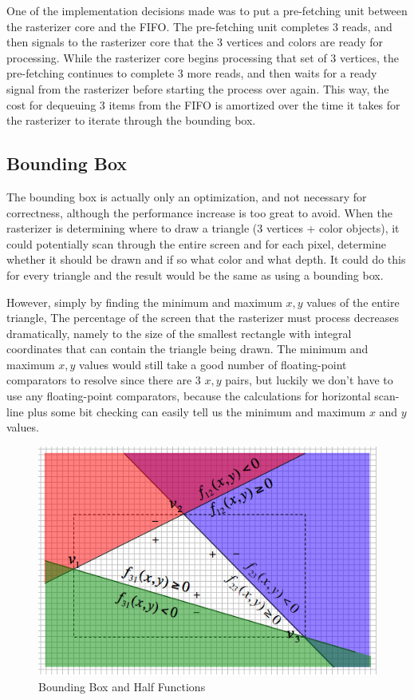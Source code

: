 \documentclass[letterpaper,10pt]{article}
\begin{document}
One of the implementation decisions made was to put a pre-fetching unit between the rasterizer core and the FIFO. The pre-fetching unit completes 3 reads, and then signals to the rasterizer core that the 3 vertices and colors are ready for processing. While the rasterizer core begins processing that set of 3 vertices, the pre-fetching continues to complete 3 more reads, and then waits for a ready signal from the rasterizer before starting the process over again. This way, the cost for dequeuing 3 items from the FIFO is amortized over the time it takes for the rasterizer to iterate through the bounding box.

\subsection{Bounding Box}
The bounding box is actually only an optimization, and not necessary for correctness, although the performance increase is too great to avoid. When the rasterizer is determining where to draw a triangle (3 vertices + color objects), it could potentially scan through the entire screen and for each pixel, determine whether it should be drawn and if so what color and what depth. It could do this for every triangle and the result would be the same as using a bounding box. 

However, simply by finding the minimum and maximum $x, y$ values of the entire triangle, The percentage of the screen that the rasterizer must process decreases dramatically, namely to the size of the smallest rectangle with integral coordinates that can contain the triangle being drawn. The minimum and maximum  $x,y$ values would still take a good number of floating-point comparators to resolve since there are 3 $x,y$ pairs, but luckily we don't have to use any floating-point comparators, because the calculations for horizontal scan-line plus some bit checking can easily tell us the minimum and maximum $x$ and $y$ values.

\begin{figure}[h!]
\begin{center}
\includegraphics[scale=.68]{bounding_box.png}
\end{center}
\caption{Bounding Box and Half Functions}
\label{fig:bounding_box_and_scanline}
\end{figure}
\end{document}
